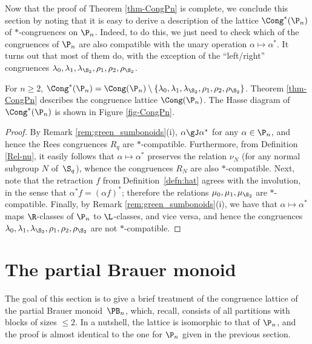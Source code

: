 Now that the proof of Theorem \ref{thm-CongPn} is complete, we conclude this section by noting that it is easy to derive a description of the lattice $\Cong^*(\P_n)$ of $\ast$-congruences on $\P_n$.  Indeed, to do this, we just need to check which of the congruences of $\P_n$ are also compatible with the unary operation $\alpha\mapsto\alpha^\ast$.  It turns out that most of them do, with the exception of the ``left/right'' congruences $\lambda_0,\lambda_1,\lambda_{\S_2},\rho_1,\rho_2,\rho_{\S_2}$.


\begin{corollary}\label{cor:main_Pn}
For $n\geq 2$, $\Cong^\ast(\P_n)=\Cong(\P_n)\setminus\{\lambda_0,\lambda_1,\lambda_{\S_2},\rho_1,\rho_2,\rho_{\S_2}\}$.  Theorem \ref{thm-CongPn} describes the congruence lattice $\Cong(\P_n)$.  The Hasse diagram of $\Cong^*(\P_n)$ is shown in Figure \ref{fig-CongPn}.
\end{corollary}

\begin{proof}
By Remark \ref{rem:green_sumbonoids}(i), $\alpha\gJ\alpha^\ast$ for any $\alpha\in\P_n$, and hence the Rees congruences $R_q$ are $\ast$-compatible.
Furthermore, from Definition \ref{Rel-nu}, it easily follows that $\alpha\mapsto\alpha^\ast$ preserves the relation $\nu_N$ (for any normal subgroup $N$ of~$ \S_q$), whence the congruences $R_N$ are also $\ast$-compatible.
Next, note that the retraction $f$ from Definition~\ref{defn:hat} agrees with the involution, in the sense that $\alpha^\ast f=(\alpha f)^\ast$; therefore the relations $\mu_0,\mu_1,\mu_{\S_2}$ are $\ast$-compatible.
Finally, by  Remark \ref{rem:green_sumbonoids}(i), we have that $\alpha\mapsto\alpha^\ast$ maps $\R$-classes of $\P_n$ to $\L$-classes, and vice versa, and hence the congruences $\lambda_0,\lambda_1,\lambda_{\S_2},\rho_1,\rho_2,\rho_{\S_2}$ are not $\ast$-compatible.
\end{proof}




\section{The partial Brauer monoid }\label{sec:PBn}


The goal of this section is to give a brief treatment of the congruence lattice of the partial Brauer monoid~$\PB_n$, which, recall, consists of all partitions with blocks of sizes $\leq 2$.
In a nutshell, the lattice is isomorphic to that of $\P_n$, and the proof is almost identical  to the one for $\P_n$ given in the previous section.

